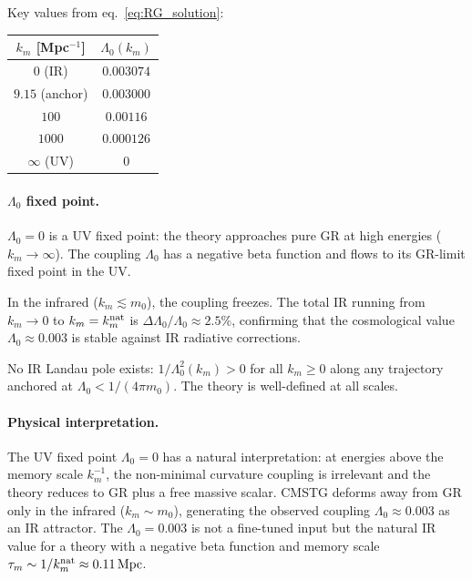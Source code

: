 \documentclass[12pt,a4paper]{article}
\begin{document}
Key values from eq.~\eqref{eq:RG_solution}:

\begin{center}
\begin{tabular}{cc}
\toprule
$k_m$ [Mpc$^{-1}$] & $\Lambda_0(k_m)$ \\
\midrule
$0$  (IR)        & $0.003074$ \\
$9.15$ (anchor)  & $0.003000$ \\
$100$            & $0.00116$  \\
$1000$           & $0.000126$ \\
$\infty$ (UV)    & $0$        \\
\bottomrule
\end{tabular}
\end{center}

\paragraph{$\Lambda_0$ fixed point.}
$\Lambda_0 = 0$ is a UV fixed point: the theory approaches pure GR at
high energies ($k_m\to\infty$).  The coupling $\Lambda_0$ has a negative
beta function and flows to its GR-limit fixed point in the UV\@.

In the infrared ($k_m \lesssim m_0$), the coupling freezes.
The total IR running from $k_m\to 0$ to $k_m = k_m^{\rm nat}$ is
$\Delta\Lambda_0/\Lambda_0 \approx 2.5\%$, confirming that the
cosmological value $\Lambda_0\approx 0.003$ is stable against IR
radiative corrections.

No IR Landau pole exists: $1/\Lambda_0^2(k_m)>0$ for all
$k_m\geq 0$ along any trajectory anchored at $\Lambda_0<1/(4\pi m_0)$.
The theory is well-defined at all scales.

\paragraph{Physical interpretation.}
The UV fixed point $\Lambda_0=0$ has a natural interpretation: at
energies above the memory scale $k_m^{-1}$, the non-minimal curvature
coupling is irrelevant and the theory reduces to GR plus a free massive
scalar.  CMSTG deforms away from GR only in the infrared
($k_m\sim m_0$), generating the observed coupling $\Lambda_0\approx 0.003$
as an IR attractor.  The $\Lambda_0 = 0.003$ is not a fine-tuned
input but the natural IR value for a theory with a negative beta function
and memory scale $\tau_m\sim 1/k_m^{\rm nat} \approx 0.11\,\mathrm{Mpc}$.

\end{document}
